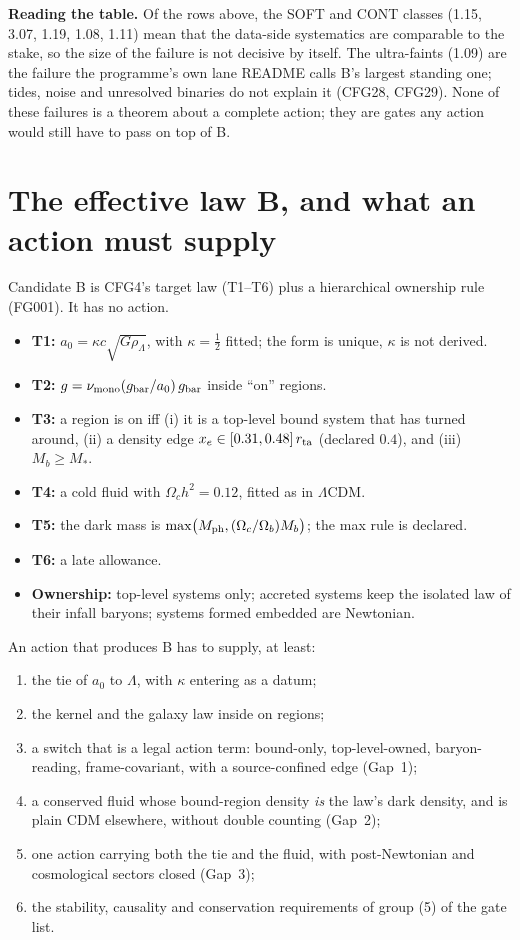\documentclass[10pt]{article}
\begin{document}
\textbf{Reading the table.} Of the rows above, the SOFT and CONT classes (1.15, 3.07, 1.19, 1.08, 1.11) mean that the data-side systematics are comparable to the stake, so the size of the failure is not decisive by itself. The ultra-faints (1.09) are the failure the programme's own lane README calls B's largest standing one; tides, noise and unresolved binaries do not explain it (CFG28, CFG29). None of these failures is a theorem about a complete action; they are gates any action would still have to pass on top of B.

\section{The effective law B, and what an action must supply}\label{sec:law}

Candidate B is CFG4's target law (T1--T6) plus a hierarchical ownership rule (FG001). It has no action.
\begin{itemize}
\item \textbf{T1:} $a_0=\kappa c\sqrt{G\rho_\Lambda}$, with $\kappa=\tfrac12$ fitted; the form is unique, $\kappa$ is not derived.
\item \textbf{T2:} $g=\nu_{\rm mono}(g_{\rm bar}/a_0)\,g_{\rm bar}$ inside ``on'' regions.
\item \textbf{T3:} a region is on iff (i) it is a top-level bound system that has turned around, (ii) a density edge $x_e\in[0.31,0.48]\,r_{\rm ta}$ (declared $0.4$), and (iii) $M_b\ge M_*$.
\item \textbf{T4:} a cold fluid with $\Omega_ch^2=0.12$, fitted as in $\Lambda$CDM.
\item \textbf{T5:} the dark mass is $\max\!\big(M_{\rm ph},(\Omega_c/\Omega_b)M_b\big)$; the max rule is declared.
\item \textbf{T6:} a late allowance.
\item \textbf{Ownership:} top-level systems only; accreted systems keep the isolated law of their infall baryons; systems formed embedded are Newtonian.
\end{itemize}

An action that produces B has to supply, at least:
\begin{enumerate}[label=(\alph*)]
\item the tie of $a_0$ to $\Lambda$, with $\kappa$ entering as a datum;
\item the kernel and the galaxy law inside on regions;
\item a switch that is a legal action term: bound-only, top-level-owned, baryon-reading, frame-covariant, with a source-confined edge (Gap~1);
\item a conserved fluid whose bound-region density \emph{is} the law's dark density, and is plain CDM elsewhere, without double counting (Gap~2);
\item one action carrying both the tie and the fluid, with post-Newtonian and cosmological sectors closed (Gap~3);
\item the stability, causality and conservation requirements of group (5) of the gate list.
\end{enumerate}
\end{document}
